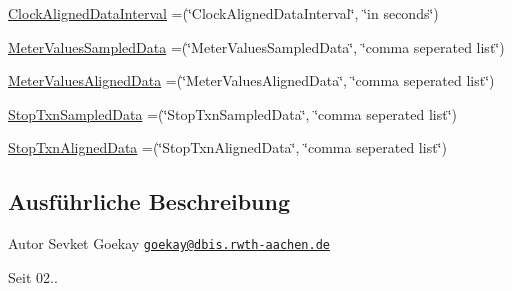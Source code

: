 \begin{DoxyCompactItemize}
\item 
\hyperlink{enumde_1_1rwth_1_1idsg_1_1steve_1_1web_1_1dto_1_1ocpp15_1_1_configuration_key_enum_a07d1dbf64e1bb3c3b50f09bada11d31d}{Clock\+Aligned\+Data\+Interval} =(\char`\"{}Clock\+Aligned\+Data\+Interval\char`\"{}, \char`\"{}in seconds\char`\"{})
\item 
\hyperlink{enumde_1_1rwth_1_1idsg_1_1steve_1_1web_1_1dto_1_1ocpp15_1_1_configuration_key_enum_ad95d1535d068131de3ce7769885d5e16}{Meter\+Values\+Sampled\+Data} =(\char`\"{}Meter\+Values\+Sampled\+Data\char`\"{}, \char`\"{}comma seperated list\char`\"{})
\item 
\hyperlink{enumde_1_1rwth_1_1idsg_1_1steve_1_1web_1_1dto_1_1ocpp15_1_1_configuration_key_enum_ac9e6b9e49500040c370a101ea6c8d71a}{Meter\+Values\+Aligned\+Data} =(\char`\"{}Meter\+Values\+Aligned\+Data\char`\"{}, \char`\"{}comma seperated list\char`\"{})
\item 
\hyperlink{enumde_1_1rwth_1_1idsg_1_1steve_1_1web_1_1dto_1_1ocpp15_1_1_configuration_key_enum_ac518bfd2cc29fef1a5d331b4819e72d8}{Stop\+Txn\+Sampled\+Data} =(\char`\"{}Stop\+Txn\+Sampled\+Data\char`\"{}, \char`\"{}comma seperated list\char`\"{})
\item 
\hyperlink{enumde_1_1rwth_1_1idsg_1_1steve_1_1web_1_1dto_1_1ocpp15_1_1_configuration_key_enum_a81e4a64dd31a431a1ca5b118f431e18a}{Stop\+Txn\+Aligned\+Data} =(\char`\"{}Stop\+Txn\+Aligned\+Data\char`\"{}, \char`\"{}comma seperated list\char`\"{})
\end{DoxyCompactItemize}


\subsection{Ausführliche Beschreibung}
\begin{DoxyAuthor}{Autor}
Sevket Goekay \href{mailto:goekay@dbis.rwth-aachen.de}{\tt goekay@dbis.\+rwth-\/aachen.\+de} 
\end{DoxyAuthor}
\begin{DoxySince}{Seit}
02.. 
\end{DoxySince}


